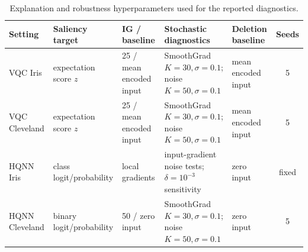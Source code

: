 \begin{table}[!t]
\centering
\caption{Explanation and robustness hyperparameters used for the reported diagnostics.}
\label{tab:explanation-hyperparameters}
\scriptsize
\setlength{\tabcolsep}{3pt}
\begin{tabular}{@{}lp{2.2cm}p{2.2cm}p{2.7cm}p{1.8cm}c@{}}
\toprule
Setting & Saliency target & IG / baseline & Stochastic diagnostics & Deletion baseline & Seeds \\
\midrule
VQC Iris & expectation score $z$ & 25 / mean encoded input & SmoothGrad $K=30,\sigma=0.1$; noise $K=50,\sigma=0.1$ & mean encoded input & 5 \\
VQC Cleveland & expectation score $z$ & 25 / mean encoded input & SmoothGrad $K=30,\sigma=0.1$; noise $K=50,\sigma=0.1$ & mean encoded input & 5 \\
HQNN Iris & class logit/probability & local gradients & input-gradient noise tests; $\delta=10^{-3}$ sensitivity & zero input & fixed \\
HQNN Cleveland & binary logit/probability & 50 / zero input & SmoothGrad $K=30,\sigma=0.1$; noise $K=50,\sigma=0.1$ & zero input & 5 \\
\bottomrule
\end{tabular}
\end{table}
